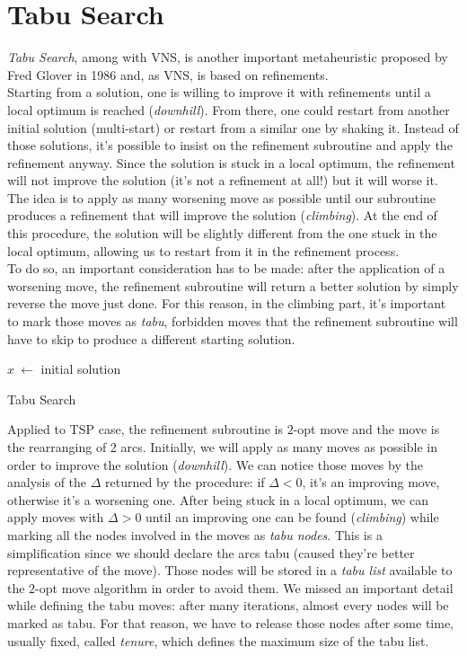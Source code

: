 \section{Tabu Search}
\emph{Tabu Search}, among with VNS, is another important metaheuristic proposed
by Fred Glover in 1986\citep{glover1986future} and, as VNS, is based on
refinements.\\ Starting from a solution, one is willing to improve it with
refinements until a local optimum is reached (\emph{downhill}). From there, one
could restart from another initial solution (multi-start) or restart from a
similar one by shaking it. Instead of those solutions, it's possible to insist
on the refinement subroutine and apply the refinement anyway. Since the solution
is stuck in a local optimum, the refinement will not improve the solution (it's
not a refinement at all!) but it will worse it. The idea is to apply as many
worsening move as possible until our subroutine produces a refinement that will
improve the solution (\emph{climbing}). At the end of this procedure, the
solution will be slightly different from the one stuck in the local optimum,
allowing us to restart from it in the refinement process.\\ To do so, an
important consideration has to be made: after the application of a worsening
move, the refinement subroutine will return a better solution by simply reverse
the move just done. For this reason, in the climbing part, it's important to
mark those moves as \emph{tabu}, forbidden moves that the refinement subroutine
will have to skip to produce a different starting solution.\\

\begin{algorithm}[H]
\SetAlgoLined
{}
    $x\ \leftarrow$ initial solution\;
    \caption{Tabu Search}
\end{algorithm}

Applied to TSP case, the refinement subroutine is $2$-opt move and the move is
the rearranging of 2 arcs. Initially, we will apply as many moves as possible in
order to improve the solution (\emph{downhill}). We can notice those moves by the
analysis of the $\Delta$ returned by the procedure: if $\Delta < 0$, it's an
improving move, otherwise it's a worsening one. After being stuck in a local
optimum, we can apply moves with $\Delta > 0$ until an improving one can be
found (\emph{climbing}) while marking all the nodes involved in the moves as
\emph{tabu nodes}. This is a simplification since we should declare the arcs
tabu (caused they're better representative of the move). Those nodes will be
stored in a \emph{tabu list} available to the $2$-opt move algorithm in order to
avoid them. We missed an important detail while defining the tabu moves: after
many iterations, almost every nodes will be marked as tabu. For that reason, we
have to release those nodes after some time, usually fixed, called
\emph{tenure}, which defines the maximum size of the tabu list. 

